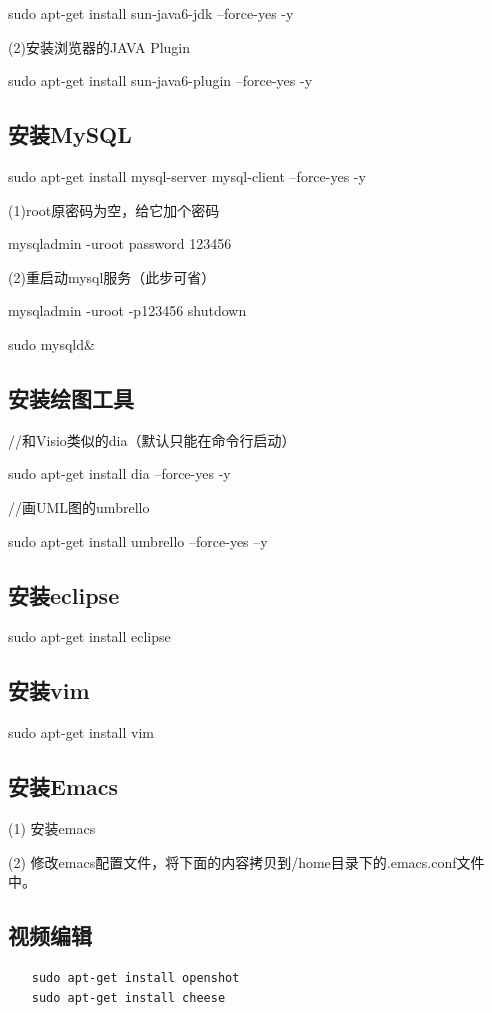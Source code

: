 sudo apt-get install sun-java6-jdk --force-yes -y

(2)安装浏览器的JAVA Plugin

sudo apt-get install sun-java6-plugin --force-yes -y

\subsection{安装MySQL}
sudo apt-get install mysql-server mysql-client --force-yes -y

(1)root原密码为空，给它加个密码

mysqladmin -uroot password 123456

(2)重启动mysql服务（此步可省）

mysqladmin -uroot -p123456 shutdown

sudo mysqld\&

\subsection{安装绘图工具}
//和Visio类似的dia（默认只能在命令行启动）

sudo apt-get install dia --force-yes -y

//画UML图的umbrello


sudo apt-get install umbrello --force-yes –y

\subsection{安装eclipse}
sudo apt-get install eclipse

\subsection{安装vim}
sudo apt-get install vim

\subsection{安装Emacs}
(1) 安装emacs

(2) 修改emacs配置文件，将下面的内容拷贝到/home目录下的.emacs.conf文件中。

\subsection{视频编辑}
\begin{verbatim}
　　sudo apt-get install openshot
　　sudo apt-get install cheese
\end{verbatim}

